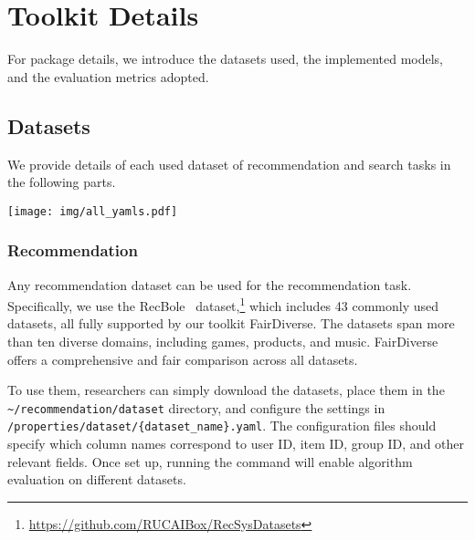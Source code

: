 \section{Toolkit Details}

For package details, we introduce the datasets used, the implemented models, and the evaluation metrics adopted.

\subsection{Datasets}\label{sec:datasets}
We provide details of each used dataset of recommendation and search tasks in the following parts.

\begin{figure*}[t]  
    \centering    
    \texttt{[image: img/all\_yamls.pdf]}
    \caption{The usage of FairDiverse with three steps: (1) Download the datasets and check the default parameters of the four stages of pipelines; (2) Set custom configuration file to execute the pipeline. The $*$tuning\_variables allow you to define variable values for the default settings across the four pipeline stages, with the In-processing configuration file overriding these default values when specified; (3) Run the shell command, with the task, stage, dataset, and your custom configuration file. }
    \label{fig:recommendation_yamls}
\end{figure*}


\subsubsection{Recommendation} 
Any recommendation dataset can be used for the recommendation task. Specifically, we use the RecBole~\cite{recbole} dataset,\footnote{\url{https://github.com/RUCAIBox/RecSysDatasets}} which includes 43 commonly used datasets, all fully supported by our toolkit FairDiverse. The datasets span more than ten diverse domains, including games, products, and music. FairDiverse offers a comprehensive and fair comparison across all datasets.

To use them, researchers can simply download the datasets, place them in the \verb#~/recommendation/dataset# directory, and configure the settings in \verb#/properties/dataset/{dataset_name}.yaml#. The configuration files should specify which column names correspond to user ID, item ID, group ID, and other relevant fields. Once set up, running the command will enable algorithm evaluation on different datasets.

